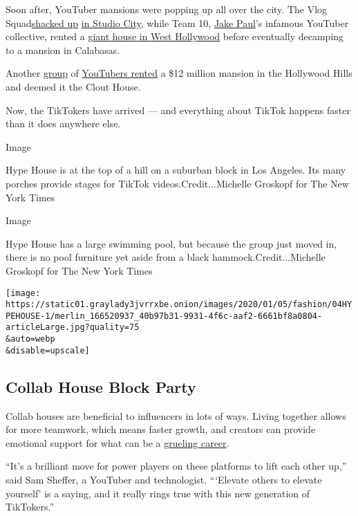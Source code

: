 Soon after, YouTuber mansions were popping up all over the city. The
Vlog Squad\href{https://www.youtube.com/watch?v=n1_PSUJCz5I}{shacked up}
\href{https://www.velvetropes.com/backstage/david-dobrik-house/}{in
Studio City}, while Team 10,
\href{https://www.nytimes3xbfgragh.onion/2017/09/08/fashion/jake-paul-team-10-youtube.html}{Jake
Paul}'s infamous YouTuber collective, rented a
\href{https://www.mic.com/articles/183081/meet-the-teens-and-parents-who-spend-hours-standing-in-the-hot-sun-outside-jake-pauls-house}{giant
house in West Hollywood} before eventually decamping to a mansion in
Calabasas.

Another
\href{https://www.wetheunicorns.com/features/clout-house-price-members-pictures/}{group}
of \href{https://www.vlogfund.com/en/blog/clout-house/}{YouTubers
rented} a \$12 million mansion in the Hollywood Hills and deemed it the
Clout House.

Now, the TikTokers have arrived --- and everything about TikTok happens
faster than it does anywhere else.

Image

Hype House is at the top of a hill on a suburban block in Los Angeles.
Its many porches provide stages for TikTok videos.Credit...Michelle
Groskopf for The New York Times

Image

Hype House has a large swimming pool, but because the group just moved
in, there is no pool furniture yet aside from a black
hammock.Credit...Michelle Groskopf for The New York Times

\texttt{[image: https://static01.graylady3jvrrxbe.onion/images/2020/01/05/fashion/04HYPEHOUSE-1/merlin\_166520937\_40b97b31-9931-4f6c-aaf2-6661bf8a0804-articleLarge.jpg?quality=75\\\&auto=webp\\\&disable=upscale]}

\hypertarget{collab-house-block-party}{%
\subsection{Collab House Block Party}\label{collab-house-block-party}}

Collab houses are beneficial to influencers in lots of ways. Living
together allows for more teamwork, which means faster growth, and
creators can provide emotional support for what can be a
\href{https://www.tubefilter.com/2019/05/31/burnout-influencers-social-media-solutions-treatment-who/}{grueling
career}.

``It's a brilliant move for power players on these platforms to lift
each other up,'' said Sam Sheffer, a YouTuber and technologist.
```Elevate others to elevate yourself' is a saying, and it really rings
true with this new generation of TikTokers.''

